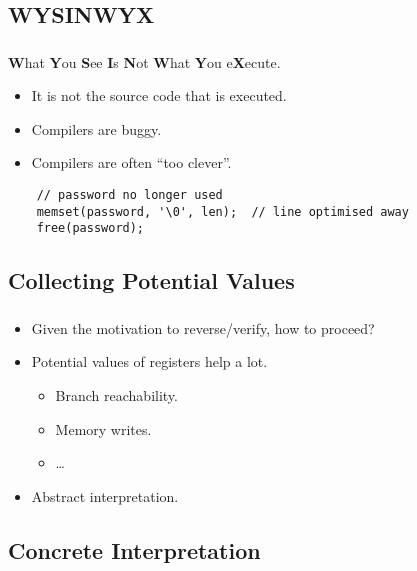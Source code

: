 \documentclass[compress]{beamer}
\begin{document}
\subsection{WYSINWYX}
\begin{frame}[fragile]
	\frametitle{\insertsubsection}

	\textbf{\Large W}hat \textbf{\Large Y}ou \textbf{\Large S}ee \textbf{\Large I}s \textbf{\Large N}ot \textbf{\Large W}hat \textbf{\Large Y}ou e\textbf{\Large X}ecute.
	\vfill

	\begin{itemize}
		\item It is not the source code that is executed.%
		\item Compilers are buggy.
		\item Compilers are often ``too clever''.
	\end{itemize}
	\vfill

	\begin{lstlisting}
	// password no longer used
	memset(password, '\0', len);  // line optimised away
	free(password);
	\end{lstlisting}
	\vfill


\end{frame}

\subsection{Collecting Potential Values}
\begin{frame}[fragile]
	\frametitle{\insertsubsection}

	\begin{itemize}
	\item Given the motivation to reverse/verify, how to proceed?
	\vfill
	\item Potential values of registers help a lot.
		\begin{itemize}
		\item Branch reachability.
		\item Memory writes.
		\item \ldots
		\end{itemize}
	\vfill
	\item Abstract interpretation.
	\end{itemize}

\end{frame}

\subsection{Concrete Interpretation}
\end{document}
